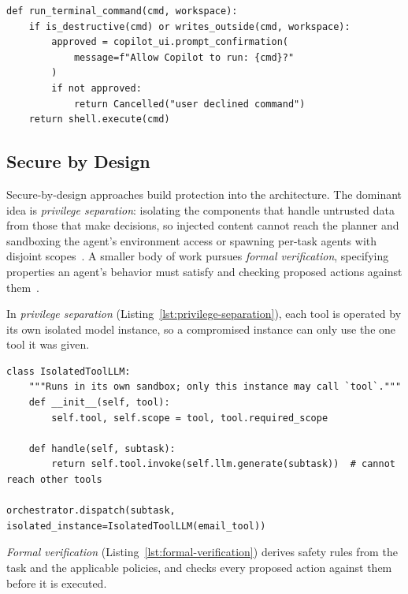 \begin{lstlisting}[caption={Human-in-the-loop: command approval before execution, as in GitHub Copilot Workspace~\cite{github-copilot}.}, label={lst:human-in-loop}]
def run_terminal_command(cmd, workspace):
    if is_destructive(cmd) or writes_outside(cmd, workspace):
        approved = copilot_ui.prompt_confirmation(
            message=f"Allow Copilot to run: {cmd}?"
        )
        if not approved:
            return Cancelled("user declined command")
    return shell.execute(cmd)
\end{lstlisting}


\subsection{Secure by Design}
Secure-by-design approaches build protection into the architecture. The dominant idea is \emph{privilege separation}: isolating the components that handle untrusted data from those that make decisions, so injected content cannot reach the planner and sandboxing the agent's environment access or spawning per-task agents with disjoint scopes~\cite{wu2025isolategpt,bagdasarian2024airgap}. A smaller body of work pursues \emph{formal verification}, specifying properties an agent's behavior must satisfy and checking proposed actions against them~\cite{chen2025shieldagent}.

In \emph{privilege separation} (Listing~\ref{lst:privilege-separation}), each tool is operated by its own isolated model instance, so a compromised instance can only use the one tool it was given.

\begin{lstlisting}[caption={Privilege separation: per-tool isolated LLM instances, in the style of IsolateGPT~\cite{wu2025isolategpt}.}, label={lst:privilege-separation}]
class IsolatedToolLLM:
    """Runs in its own sandbox; only this instance may call `tool`."""
    def __init__(self, tool):
        self.tool, self.scope = tool, tool.required_scope

    def handle(self, subtask):
        return self.tool.invoke(self.llm.generate(subtask))  # cannot reach other tools

orchestrator.dispatch(subtask, isolated_instance=IsolatedToolLLM(email_tool))
\end{lstlisting}

\emph{Formal verification} (Listing~\ref{lst:formal-verification}) derives safety rules from the task and the applicable policies, and checks every proposed action against them before it is executed.

